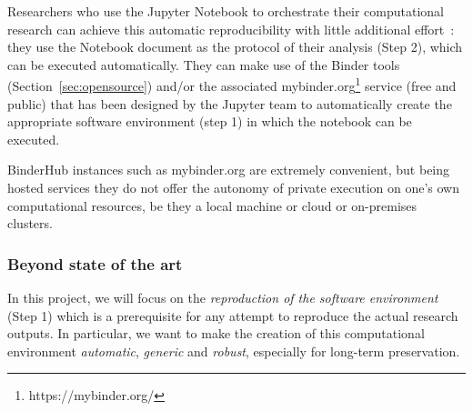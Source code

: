 \medskip Researchers who use the Jupyter Notebook to orchestrate their
computational research can achieve this automatic
reproducibility with little additional effort~\cite{Beg2021}: they use the Notebook document as
the protocol of their analysis (Step 2), which can be executed automatically.
They can make use of the Binder tools (Section~\ref{sec:opensource}) and/or the
associated  mybinder.org\footnote{https://mybinder.org/} service (free and public) that has
been designed by the Jupyter team to automatically create the appropriate
software environment (step 1) in which the notebook can be executed.

BinderHub instances such as mybinder.org are extremely convenient,
but being hosted services they do not offer the autonomy
of private execution on one's own computational resources,
be they a local machine or cloud or on-premises clusters.

\subsubsection{Beyond state of the art}

In this project, we will focus on the \emph{reproduction of the
software environment} (Step 1) which is a prerequisite for any attempt to
reproduce the actual research outputs. In particular, we want to make the
creation of this computational environment \emph{automatic}, \emph{generic} and \emph{robust},
especially for long-term preservation.

